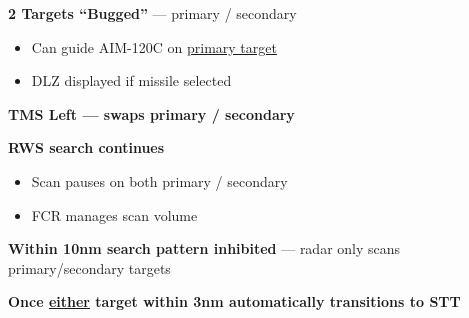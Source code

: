 \begin{tcoloritemize}
{    \begin{subitemize}
        \item \textbf{2 Targets ``Bugged''} --- primary / secondary
        \begin{itemize}
            \item Can guide AIM-120C on \underline{primary target}
            \item DLZ displayed if missile selected
        \end{itemize}
        \item \textbf{TMS Left --- swaps primary / secondary}
        \item \textbf{RWS search  continues}
        \begin{itemize}
            \item Scan pauses on both primary / secondary
            \item FCR manages scan volume
        \end{itemize}
        \item \textbf{Within 10nm search pattern inhibited} --- radar only scans primary/secondary targets
        \item \textbf{Once \underline{either} target within 3nm automatically transitions to STT}
    \end{subitemize}}
\end{tcoloritemize}

\marginfigeometry

